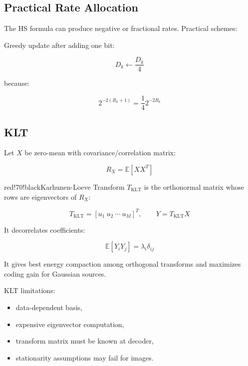 \subsection{Practical Rate Allocation}

The HS formula can produce negative or fractional rates. Practical schemes:

\begin{center}
\end{center}

Greedy update after adding one bit:

\[
D_k \leftarrow \frac{D_k}{4}
\]

because:

\[
2^{-2(R_k+1)}=\frac{1}{4}2^{-2R_k}
\]

\subsection{KLT}

Let $X$ be zero-mean with covariance/correlation matrix:

\[
R_X=\mathbb{E}[XX^T]
\]

\begin{calloutbox}{red!70!black}{Karhunen-Loeve Transform}
$T_{\text{KLT}}$ is the orthonormal matrix whose rows are eigenvectors of $R_X$:

\[
T_{\text{KLT}}=[u_1\ u_2\ \cdots\ u_M]^T,
\qquad
Y=T_{\text{KLT}}X
\]

It decorrelates coefficients:

\[
\mathbb{E}[Y_iY_j]=\lambda_i\delta_{ij}
\]

It gives best energy compaction among orthogonal transforms and maximizes coding gain for Gaussian sources.
\end{calloutbox}

KLT limitations:

\begin{itemize}
  \item data-dependent basis,
  \item expensive eigenvector computation,
  \item transform matrix must be known at decoder,
  \item stationarity assumptions may fail for images.
\end{itemize}

